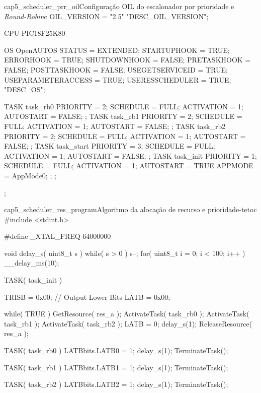 \begin{algoritmo}{cap5_scheduler_prr_oil}{Configuração OIL do escalonador por prioridade e \emph{Round-Robin}}{c}
OIL_VERSION = "2.5" "DESC_OIL_VERSION";

CPU PIC18F25K80 {
	OS OpenAUTOS {
		STATUS = EXTENDED;
		STARTUPHOOK = TRUE;
		ERRORHOOK = TRUE;
		SHUTDOWNHOOK = FALSE;
		PRETASKHOOK = FALSE;
		POSTTASKHOOK = FALSE;
		USEGETSERVICEID = TRUE;
		USEPARAMETERACCESS = TRUE;
		USERESSCHEDULER = TRUE;
	} "DESC_OS";
	
	TASK task_rb0 {
		PRIORITY = 2;
		SCHEDULE = FULL;
		ACTIVATION = 1;
		AUTOSTART = FALSE;
	};
	TASK task_rb1 {
		PRIORITY = 2;
		SCHEDULE = FULL;
		ACTIVATION = 1;
		AUTOSTART = FALSE;
	};
	TASK task_rb2 {
		PRIORITY = 2;
		SCHEDULE = FULL;
		ACTIVATION = 1;
		AUTOSTART = FALSE;
	};
	TASK task_start {
		PRIORITY = 3;
		SCHEDULE = FULL;
		ACTIVATION = 1;
		AUTOSTART = FALSE;
	};
	TASK task_init {
		PRIORITY = 1;
		SCHEDULE = FULL;
		ACTIVATION = 1;
		AUTOSTART = TRUE {
			APPMODE = AppMode0;
		};
	};	
};
\end{algoritmo}

\begin{algoritmo}{cap5_scheduler_res_program}{Algoritmo da alocação de recurso e prioridade-teto}{c}
#include <stdint.h>

#define _XTAL_FREQ 64000000

void delay_s( uint8_t s ) {
	while( s > 0 ) {
		s--;
		for( uint8_t i = 0; i < 100; i++ ) {
			__delay_ms(10);
		}
	}
}

TASK( task_init ) {
	TRISB = 0x00; // Output Lower Bits
	LATB = 0x00;
	
	while( TRUE ) {
		GetResource( res_a );
		ActivateTask( task_rb0 );
		ActivateTask( task_rb1 );
		ActivateTask( task_rb2 );
		LATB = 0;
		delay_s(1);
		ReleaseResource( res_a );
	}
}

TASK( task_rb0 ) {
	LATBbits.LATB0 = 1;
	delay_s(1);
	TerminateTask();
}

TASK( task_rb1 ) {
	LATBbits.LATB1 = 1;
	delay_s(1);
	TerminateTask();
}

TASK( task_rb2 ) {
	LATBbits.LATB2 = 1;
	delay_s(1);
	TerminateTask();
}
\end{algoritmo}

